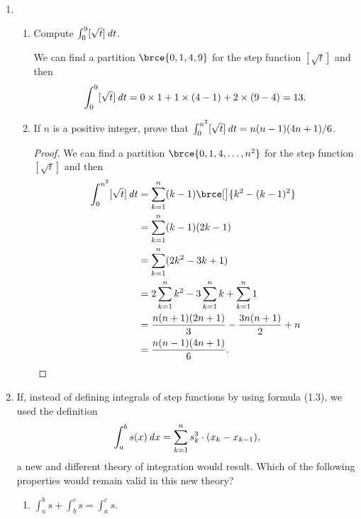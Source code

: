 \documentclass[a4paper]{article}
\begin{document}
\begin{enumerate}
\begin{proof}
    With additional condition \(S \subseteq T\), we have \(S \cup T = T\),
    \(S \cap T = S\), and \(S - T = \emptyset\).  Substitute into
    \eqref{eq:3} and we get
    \begin{gather*}
      n(T) = n(\emptyset) + n(S) + n(T - S), \text{ or} \\
      n(T - S) = n(T) - n(S).
    \end{gather*}
    This proves the difference property.
  \end{proof}

\item
  \begin{enumerate}
  \item Compute \(\int_0^9 [\sqrt t] \mathop{}\!\mathit{d} t\).

    We can find a partition \(\brce{0, 1, 4, 9}\) for the step function
    \([\sqrt t]\) and then
    \begin{displaymath}
      \int_0^9 [\sqrt t] \mathop{}\!\mathit{d} t = 0 \times 1 + 1 \times (4-1) + 2 \times (9-4) = 13.
    \end{displaymath}

  \item If \(n\) is a positive integer, prove that
    \(\int_0^{n^2} [\sqrt t] \mathop{}\!\mathit{d} t = n(n-1)(4n+1)/6\).

    \begin{proof}
      We can find a partition \(\brce{0, 1, 4, \dotsc, n^2}\) for the step
      function \([\sqrt t]\) and then
      \begin{align*}
        \int_0^{n^2} [\sqrt t] \dt
          &= \sum_{k=1}^n (k-1)\brce[\big]{k^2 - (k-1)^2} \\
          &= \sum_{k=1}^n (k-1)(2k-1) \\
          &= \sum_{k=1}^n (2k^2 - 3k + 1) \\
          &= 2 \sum_{k=1}^n k^2 - 3 \sum_{k=1}^n k + \sum_{k=1}^n 1 \\
          &= \frac{n(n+1)(2n+1)}{3} - \frac{3n(n+1)}{2} + n \\
          &= \frac{n(n-1)(4n+1)}{6}. \qedhere
      \end{align*}
  \end{proof}
  \end{enumerate}

\item If, instead of defining integrals of step functions by using formula
  (1.3), we used the definition
  \[
    \int_a^b s(x) \mathop{}\!\mathit{d} x = \sum_{k=1}^n s_k^3 \cdot (x_k - x_{k-1}),
  \]
  a new and different theory of integration would result.  Which of the
  following properties would remain valid in this new theory?
  \begin{enumerate}
    \everymath{\displaystyle}
  \item \(\int_a^b s + \int_b^c s = \int_a^c s\).


\end{enumerate}
\end{enumerate}
\end{document}

